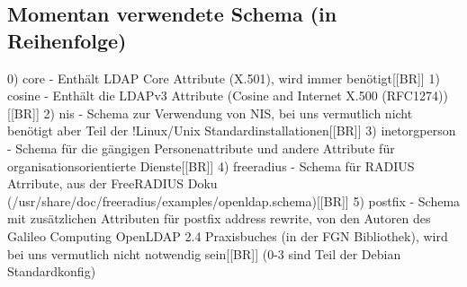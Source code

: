 \documentclass[11pt,a4paper,titlepage=firstiscover]{scrartcl} %
\begin{document}
\subsection{Momentan verwendete Schema (in Reihenfolge)}
0) core - Enthält LDAP Core Attribute (X.501), wird immer benötigt[[BR]]
1) cosine - Enthält die LDAPv3 Attribute (Cosine and Internet X.500 (RFC1274))[[BR]]
2) nis - Schema zur Verwendung von NIS, bei uns vermutlich nicht benötigt aber Teil der !Linux/Unix Standardinstallationen[[BR]]
3) inetorgperson - Schema für die gängigen Personenattribute und andere Attribute für organisationsorientierte Dienste[[BR]]
4) freeradius - Schema für RADIUS Atrribute, aus der FreeRADIUS Doku (/usr/share/doc/freeradius/examples/openldap.schema)[[BR]]
5) postfix - Schema mit zusätzlichen Attributen für postfix address rewrite, von den Autoren des Galileo Computing OpenLDAP 2.4 Praxisbuches (in der FGN Bibliothek), wird bei uns vermutlich nicht notwendig sein[[BR]]
(0-3 sind Teil der Debian Standardkonfig)
\end{document}
